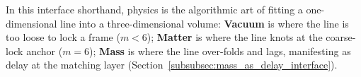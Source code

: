 In this interface shorthand, physics is the algorithmic art of fitting a one-dimensional line into a three-dimensional volume:
\textbf{Vacuum} is where the line is too loose to lock a frame ($m<6$);
\textbf{Matter} is where the line knots at the coarse-lock anchor ($m=6$);
\textbf{Mass} is where the line over-folds and lags, manifesting as delay at the matching layer (Section~\ref{subsubsec:mass_as_delay_interface}).


